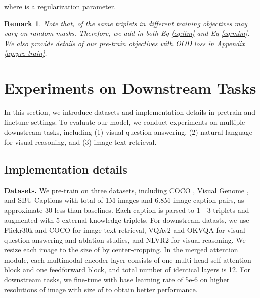 \documentclass{article}
\newtheorem{remark}{Remark}
\begin{document}
where   is a regularization parameter.
\setlength{\textfloatsep}{5pt}
\begin{remark}
Note that,  of the same triplets in different training objectives may vary on random masks. Therefore, we add  in both Eq \ref{eq:itm} and Eq \ref{eq:mlm}. We also provide details of our pre-train objectives with OOD loss in Appendix \ref{ap:pre-train}.
\end{remark}






























\section{Experiments on Downstream Tasks}
In this section, we introduce datasets and implementation details in pretrain and finetune settings. To evaluate our model, we conduct experiments on multiple downstream tasks, including (1) visual question answering, (2) natural language for visual reasoning, and (3) image-text retrieval.


\subsection{Implementation details} \label{sec:imp}
\textbf{Datasets.} We pre-train on three datasets, including COCO \cite{lin2014microsoft}, Visual Genome \cite{krishna2017visual}, and SBU Captions \cite{ordonez2011im2text} with total of 1M images and 6.8M image-caption pairs, as approximate 30 less than baselines. Each caption is parsed to 1 - 3 triplets and augmented with 5 external knowledge triplets. For downstream datasts, we use Flickr30k \cite{plummer2015flickr30k} and COCO for image-text retrieval, VQAv2 \cite{antol2015vqa} and OKVQA \cite{okvqa} for visual question answering and ablation studies, and NLVR2 \cite{suhr2018corpus} for visual reasoning. We resize each image to the size of  by center-cropping. In the merged attention module, each multimodal encoder layer consists of one multi-head self-attention block and one feedforward block, and total number of identical layers is 12. For downstream tasks, we fine-tune with base learning rate of 5e-6 on higher resolutions of image with size of  to obtain better performance.
\end{document}
